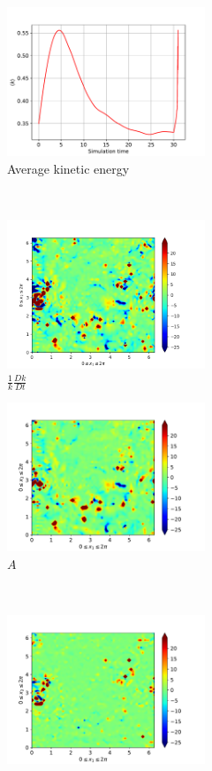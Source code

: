 \begin{figure}[H]
    \begin{subfigure}[H]{0.45\textwidth}
        \includegraphics[height=1.75in]{media/run-cds-65/ke-average1480}
        \caption{Average kinetic energy}
    \end{subfigure}
    ~
    \begin{subfigure}[H]{0.45\textwidth}
        \includegraphics[height=1.75in]{media/run-cds-65/ke-1480}
        \caption{$\frac{1}{k} \frac{D k}{Dt}$}
    \end{subfigure}
    \newline
    \begin{subfigure}{0.45\textwidth}
        \includegraphics[height=1.75in]{media/run-cds-65/A-ke-1480}
        \caption{$A$}
    \end{subfigure}
    ~
    \begin{subfigure}{0.45\textwidth}
        \includegraphics[height=1.75in]{media/run-cds-65/C-ke-1480}

\end{subfigure}
\end{figure}
